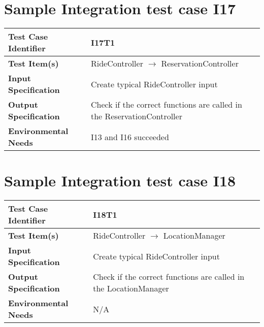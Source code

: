 \section{Sample Integration test case I17}\label{I17}
\begin{center}
	\vspace{0.6cm}
	\begin{tabular}{|l|l|}
		\hline
		\textbf{Test Case Identifier} & I17T1 \bigstrut \\\hline
		\textbf{Test Item(s)} & RideController \ensuremath{\rightarrow} ReservationController \bigstrut \\\hline
		\textbf{Input Specification} & Create typical RideController input \bigstrut \\\hline
		\textbf{Output Specification} & Check if the correct functions are called in the ReservationController \bigstrut \\\hline
		\textbf{Environmental Needs} & I13 and I16 succeeded \bigstrut \\\hline
	\end{tabular}
\end{center}

\section{Sample Integration test case I18}\label{I18}
\begin{center}
	\vspace{0.6cm}
	\begin{tabular}{|l|l|}
		\hline
		\textbf{Test Case Identifier} & I18T1 \bigstrut \\\hline
		\textbf{Test Item(s)} & RideController \ensuremath{\rightarrow} LocationManager \bigstrut \\\hline
		\textbf{Input Specification} & Create typical RideController input \bigstrut \\\hline
		\textbf{Output Specification} & Check if the correct functions are called in the LocationManager \bigstrut \\\hline
		\textbf{Environmental Needs} & N/A \bigstrut \\\hline
	\end{tabular}
\end{center}

